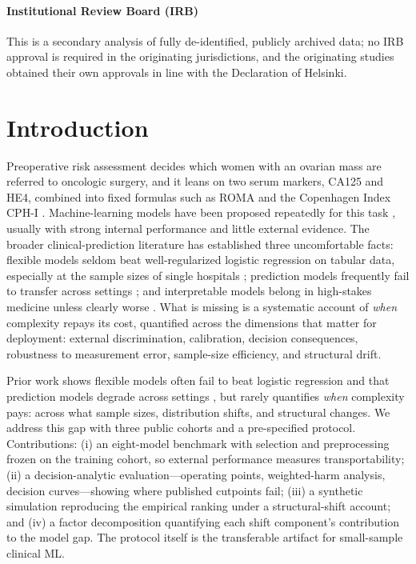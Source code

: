 \documentclass[pmlr,twocolumn,10pt]{jmlr} %
\begin{document}
\paragraph*{Institutional Review Board (IRB)}
This is a secondary analysis of fully de-identified, publicly archived data;
no IRB approval is required in the originating jurisdictions, and the
originating studies obtained their own approvals in line with the
Declaration of Helsinki.
\fi

\section{Introduction}

Preoperative risk assessment decides which women with an ovarian mass are
referred to oncologic surgery, and it leans on two serum markers, CA125 and
HE4, combined into fixed formulas such as ROMA \citep{moore2011} and the
Copenhagen Index CPH-I \citep{karlsen2015}. Machine-learning models have
been proposed repeatedly for this task \citep{kawakami2019,lu2020}, usually
with strong internal performance and little external evidence. The broader
clinical-prediction literature has established three uncomfortable facts:
flexible models seldom beat well-regularized logistic regression on tabular
data, especially at the sample sizes of single hospitals
\citep{christodoulou2019,vanderploeg2014}; prediction models frequently fail
to transfer across settings \citep{roberts2021,wynants2020}; and
interpretable models belong in high-stakes medicine unless clearly worse
\citep{rudin2019,caruana2015}. What is missing is a systematic account of
\emph{when} complexity repays its cost, quantified across the dimensions
that matter for deployment: external discrimination, calibration, decision
consequences, robustness to measurement error, sample-size efficiency, and
structural drift.

Prior work shows flexible models often fail to beat logistic regression
\citep{christodoulou2019} and that prediction models degrade across
settings \citep{roberts2021,wynants2020}, but rarely quantifies
\emph{when} complexity pays: across what sample sizes, distribution shifts,
and structural changes. We address this gap with three public cohorts and a
pre-specified protocol. Contributions: (i) an eight-model benchmark with
selection and preprocessing frozen on the training cohort, so external
performance measures transportability; (ii) a decision-analytic
evaluation---operating points, weighted-harm analysis, decision
curves---showing where published cutpoints fail; (iii) a synthetic
simulation reproducing the empirical ranking under a structural-shift
account; and (iv) a factor decomposition quantifying each shift
component's contribution to the model gap. The protocol itself is the
transferable artifact for small-sample clinical ML.
\end{document}
